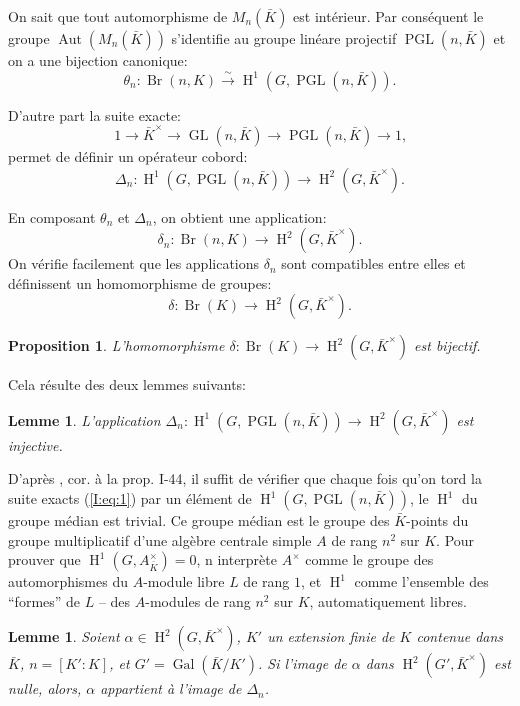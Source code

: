 \documentclass{book}
\DeclareMathOperator{\aut}{Aut}
\DeclareMathOperator{\br}{Br}
\DeclareMathOperator{\gal}{Gal}
\DeclareMathOperator{\gl}{GL}
\DeclareMathOperator{\h}{H}
\DeclareMathOperator{\pgl}{PGL}
\newcommand{\iso}{\xrightarrow\sim}
\newtheorem{proposition}[subsubsection]{Proposition}
\newtheorem{lemma}[subsubsection]{Lemme}
\begin{document}
On sait que tout automorphisme de $M_n(\bar K)$ est intérieur. Par 
conséquent le groupe $\aut(M_n(\bar K))$ s'identifie au groupe linéare 
projectif $\pgl(n,\bar K)$ et on a une bijection canonique:
\[
  \theta_n : \br(n,K) \iso \h^1\left(G,\pgl(n,\bar K)\right)\text{.}
\]

D'autre part la suite exacte:
\begin{equation}\label{I:eq:1}
  1 \to \bar K^\times \to \gl(n,\bar K) \to \pgl(n,\bar K) \to 1\text{,}
\end{equation}
permet de définir un opérateur cobord:
\[
  \Delta_n : \h^1\left(G,\pgl(n,\bar K)\right) \to \h^2(G,\bar K^\times)\text{.}
\]

En composant $\theta_n$ et $\Delta_n$, on obtient une application:
\[
  \delta_n : \br(n,K) \to \h^2(G,\bar K^\times)\text{.}
\]
On vérifie facilement que les applications $\delta_n$ sont compatibles entre 
elles et définissent un homomorphisme de groupes:
\[
  \delta : \br(K) \to \h^2(G,\bar K^\times)\text{.}
\]





\begin{proposition}\label{I:3-1-3}
L'homomorphisme $\delta:\br(K)\to \h^2(G,\bar K^\times)$ est bijectif. 
\end{proposition}

Cela résulte des deux lemmes suivants:





\begin{lemma}\label{I:3-1-4}
L'application 
$\Delta_n:\h^1\left(G,\pgl(n,\bar K)\right)\to \h^2(G,\bar K^\times)$ est 
injective.
\end{lemma}

D'après \cite{14}, cor. à la prop. I-44, il suffit de vérifier que chaque 
fois qu'on tord la suite exacts (\ref{I:eq:1}) par un élément de 
$\h^1\left(G,\pgl(n,\bar K)\right)$, le $\h^1$ du groupe médian est trivial. 
Ce groupe médian est le groupe des $\bar K$-points du groupe multiplicatif 
d'une algèbre centrale simple $A$ de rang $n^2$ sur $K$. Pour prouver que 
$\h^1(G,A_{\bar K}^\times) = 0$, n interprète $A^\times$ comme le groupe 
des automorphismes du $A$-module libre $L$ de rang $1$, et $\h^1$ comme 
l'ensemble des ``formes'' de $L$ -- des $A$-modules de rang $n^2$ sur $K$, 
automatiquement libres. 





\begin{lemma}\label{I:3-1-5}
Soient $\alpha\in \h^2(G,\bar K^\times)$, $K'$ un extension finie de $K$ 
contenue dans $\bar K$, $n=[K':K]$, et $G'=\gal(\bar K/K')$. Si l'image de 
$\alpha$ dans $\h^2(G',\bar K^\times)$ est nulle, alors, $\alpha$ appartient 
à l'image de $\Delta_n$. 
\end{lemma}
\end{document}
